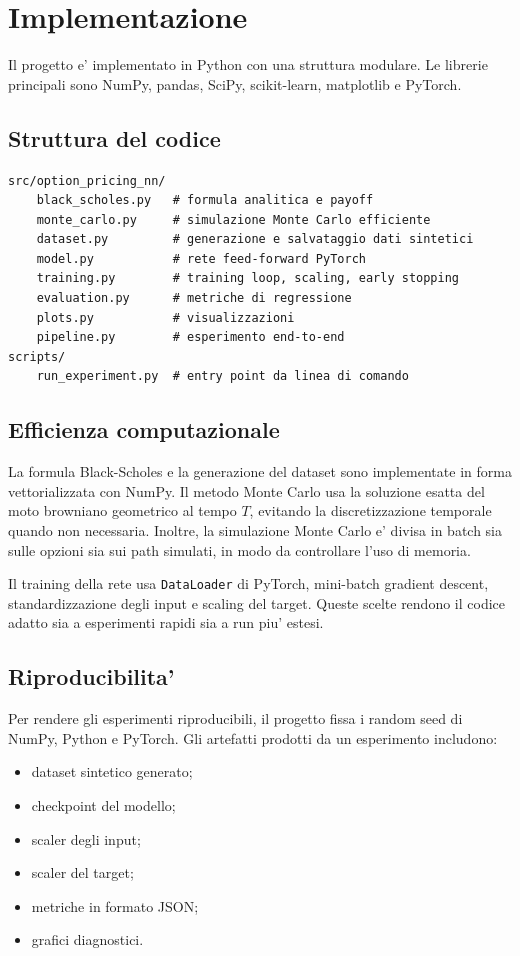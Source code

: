 \section{Implementazione}

Il progetto e' implementato in Python con una struttura modulare.
Le librerie principali sono NumPy, pandas, SciPy, scikit-learn, matplotlib e PyTorch.

\subsection{Struttura del codice}

\begin{lstlisting}[style=pythonstyle, caption={Struttura principale del progetto.}]
src/option_pricing_nn/
    black_scholes.py   # formula analitica e payoff
    monte_carlo.py     # simulazione Monte Carlo efficiente
    dataset.py         # generazione e salvataggio dati sintetici
    model.py           # rete feed-forward PyTorch
    training.py        # training loop, scaling, early stopping
    evaluation.py      # metriche di regressione
    plots.py           # visualizzazioni
    pipeline.py        # esperimento end-to-end
scripts/
    run_experiment.py  # entry point da linea di comando
\end{lstlisting}

\subsection{Efficienza computazionale}

La formula Black-Scholes e la generazione del dataset sono implementate in forma vettorializzata con NumPy.
Il metodo Monte Carlo usa la soluzione esatta del moto browniano geometrico al tempo $T$, evitando la discretizzazione temporale quando non necessaria.
Inoltre, la simulazione Monte Carlo e' divisa in batch sia sulle opzioni sia sui path simulati, in modo da controllare l'uso di memoria.

Il training della rete usa \texttt{DataLoader} di PyTorch, mini-batch gradient descent, standardizzazione degli input e scaling del target.
Queste scelte rendono il codice adatto sia a esperimenti rapidi sia a run piu' estesi.

\subsection{Riproducibilita'}

Per rendere gli esperimenti riproducibili, il progetto fissa i random seed di NumPy, Python e PyTorch.
Gli artefatti prodotti da un esperimento includono:

\begin{itemize}
    \item dataset sintetico generato;
    \item checkpoint del modello;
    \item scaler degli input;
    \item scaler del target;
    \item metriche in formato JSON;
    \item grafici diagnostici.
\end{itemize}

